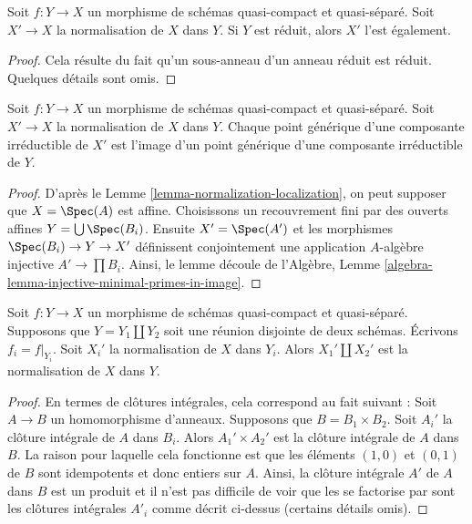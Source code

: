 \begin{lemma}
\label{lemma-normalization-in-reduced}
Soit $f : Y \to X$ un morphisme de schémas quasi-compact et quasi-séparé. Soit $X' \to X$ la normalisation
de $X$ dans $Y$. Si $Y$ est réduit, alors $X'$ l'est
également.
\end{lemma}

\begin{proof}
Cela résulte du fait qu'un sous-anneau d'un anneau réduit est réduit. Quelques
détails sont omis.
\end{proof}

\begin{lemma}
\label{lemma-normalization-generic}
Soit $f : Y \to X$ un morphisme de schémas quasi-compact et quasi-séparé. Soit $X' \to X$
la normalisation de $X$ dans $Y$. Chaque point générique d'une composante
irréductible de $X'$ est l'image d'un point générique d'une composante
irréductible de $Y$.
\end{lemma}

\begin{proof}
D'après le Lemme \ref{lemma-normalization-localization}, on peut supposer que $X = \Spec(A)$ est
affine. Choisissons un recouvrement fini par des ouverts affines $Y = \bigcup \Spec(B_i)$.
Ensuite $X' = \Spec(A')$ et les morphismes $\Spec(B_i) \to Y \to X'$ définissent
conjointement une application $A$-algèbre
injective $A' \to \prod B_i$.
Ainsi, le lemme découle de l'Algèbre, Lemme \ref{algebra-lemma-injective-minimal-primes-in-image}.
\end{proof}

\begin{lemma}
\label{lemma-normalization-in-disjoint-union}
Soit $f : Y \to X$ un morphisme de schémas quasi-compact et quasi-séparé. Supposons que
$Y = Y_1 \amalg Y_2$ soit une réunion disjointe de deux schémas. Écrivons $f_i = f|_{Y_i}$.
Soit $X_i'$ la normalisation de $X$ dans $Y_i$. Alors $X_1' \amalg X_2'$
est la normalisation de $X$ dans $Y$.
\end{lemma}

\begin{proof}
En termes de clôtures intégrales, cela correspond au fait suivant : Soit $A \to B$ un
homomorphisme d'anneaux. Supposons que $B = B_1 \times B_2$. Soit $A_i'$ la clôture
intégrale de $A$ dans $B_i$. Alors $A_1' \times A_2'$ est la clôture
intégrale de $A$ dans $B$. La raison pour laquelle
cela fonctionne est que les éléments $(1, 0)$ et $(0, 1)$ de $B$ sont idempotents
et donc entiers sur $A$. Ainsi, la clôture intégrale $A'$ de $A$
dans $B$ est un produit et il n'est pas difficile de voir que les se factorise
par sont les clôtures intégrales $A'_i$ comme décrit ci-dessus (certains détails
omis).
\end{proof}

